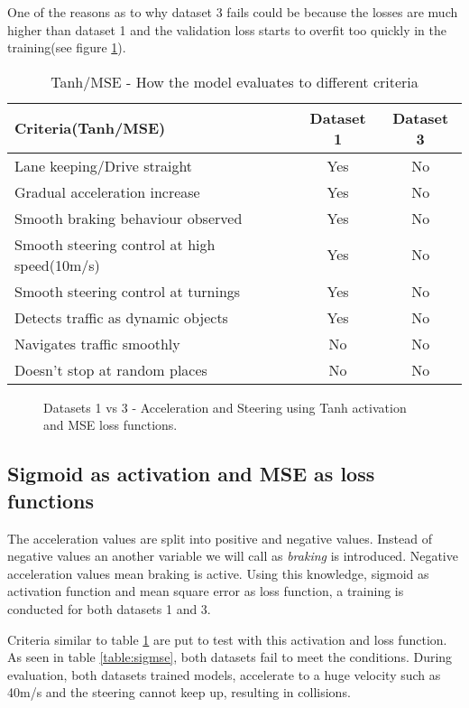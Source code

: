 One of the reasons as to why dataset 3 fails could be because the losses are much higher
than dataset 1 and the validation loss starts to overfit too quickly in the training(see
figure \ref{fig:ds1andd3tanhactivatonMSE}).
\begin{table}[h]
    \centering
\begin{tabular}{lcc}
    \toprule
    Criteria(Tanh/MSE) & Dataset 1 & Dataset 3 \\\midrule
    Lane keeping/Drive straight  & Yes & No  \\
    Gradual acceleration increase & Yes & No\\
    Smooth braking behaviour observed & Yes & No \\
    Smooth steering control at high speed(10m/s) & Yes & No \\
    Smooth steering control at turnings & Yes & No\\
    Detects traffic as dynamic objects & Yes & No\\
    Navigates traffic smoothly & No & No\\
    Doesn't stop at random places & No & No \\\bottomrule
\end{tabular}
\caption{Tanh/MSE - How the model evaluates to different criteria}
\label{table:tanhmse}
\end{table}
\begin{figure}[h]
	\centering
    \def\svgwidth{\textwidth}
    \caption{Datasets 1 vs 3 - Acceleration and Steering using Tanh activation and MSE loss
    functions.}
    \label{fig:ds1andd3tanhactivatonMSE}
\end{figure}

\subsection{Sigmoid as activation and MSE as loss functions}
The acceleration values are split into positive and negative values. Instead of negative
values an another variable we will call as \textit{braking} is introduced. Negative
acceleration values mean braking is active. Using this knowledge, sigmoid as activation function and mean
square error as loss function, a training is conducted for both datasets 1 and 3.

Criteria similar to table \ref{table:tanhmse} are put to test with this activation and
loss function. As seen in table \ref{table:sigmse}, both datasets fail to meet the
conditions. During evaluation, both datasets trained models, accelerate to a huge velocity
such as 40m/s and the steering cannot keep up, resulting in collisions.

